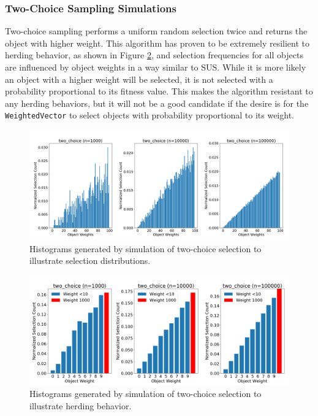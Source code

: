 \documentclass[12pt]{article}
\begin{document}
    \subsubsection{Two-Choice Sampling Simulations}
    Two-choice sampling \cite{azar1994} \cite{2choice} performs a uniform
    random selection twice and returns the object with higher weight. This
    algorithm has proven to be extremely resilient to herding behavior, as shown
    in Figure \ref{fig:pathological_two_choice}, and selection frequencies for
    all objects are influenced by object weights in a way similar to SUS. While
    it is more likely an object with a higher weight will be selected, it is not
    selected with a probability proportional to its fitness value. This makes
    the algorithm resistant to any herding behaviors, but it will not be a good
    candidate if the desire is for the \texttt{WeightedVector} to select objects
    with probability proportional to its weight.

    \begin{figure}[htbp]
      \centering
      \includegraphics[scale=0.32]{images/herding_two_choice.png} 
      \caption{Histograms generated by simulation of two-choice selection
               to illustrate selection distributions.}
      \label{fig:herding_two_choice}
    \end{figure}

    \begin{figure}[htbp]
      \centering
      \includegraphics[scale=0.32]{images/pathological_two_choice.png} 
      \caption{Histograms generated by simulation of two-choice selection
               to illustrate herding behavior.}
      \label{fig:pathological_two_choice}
    \end{figure}
\end{document}
